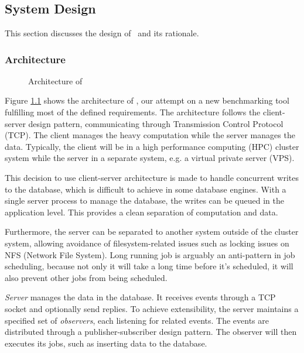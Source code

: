 \chapter{\chImplementation}
\label{ch:implementation}

\section{System Design}
\label{sec:impl.design}

This section discusses the design of \OurBenchmarkingTool~and its rationale.

\subsection{Architecture}
\label{sec:impl.architecture}

\begin{figure}
    \centering
    \caption{Architecture of \OurBenchmarkingTool}
    \label{fig:architecture}
\end{figure}

Figure \ref{fig:architecture} shows the architecture of \OurBenchmarkingTool, our attempt on a new benchmarking tool fulfilling most of the defined requirements.
The architecture follows the client-server design pattern, communicating through Transmission Control Protocol (TCP).
The client manages the heavy computation while the server manages the data.
Typically, the client will be in a high performance computing (HPC) cluster system while the server in a separate system, e.g. a virtual private server (VPS).

This decision to use client-server architecture is made to handle concurrent writes to the database, which is difficult to achieve in some database engines.
With a single server process to manage the database, the writes can be queued in the application level.
This provides a clean separation of computation and data.

Furthermore, the server can be separated to another system outside of the cluster system, allowing avoidance of filesystem-related issues such as locking issues on NFS (Network File System).
Long running job is arguably an anti-pattern in job scheduling, because not only it will take a long time before it's scheduled, it will also prevent other jobs from being scheduled.

\emph{Server} manages the data in the database.
It receives events through a TCP socket and optionally send replies.
To achieve extensibility, the server maintains a specified set of \emph{observers}, each listening for related events.
The events are distributed through a publisher-subscriber design pattern.
The observer will then executes its jobs, such as inserting data to the database.

